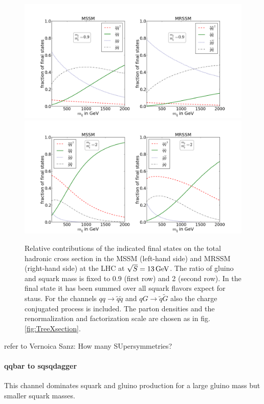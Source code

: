 \begin{figure}[!htpb]
\begin{center}
\includegraphics[scale=.45]{figures/rel_weights_mr=0,9_MSSM+MRSSM}
\includegraphics[scale=.45]{figures/rel_weights_mr=2_MSSM+MRSSM}
\caption{Relative contributions of the indicated final states on the total hadronic cross section in the MSSM (left-hand side) and MRSSM (right-hand side) at the LHC at $\sqrt{S} = \unit[13]{GeV}$. The ratio of gluino and squark mass is fixed to 0.9 (first row) and 2 (second row). In the final state it has been summed over all squark flavors expect for staus. For the channels $qq \to \tilde{q}\tilde{q}$ and $qG \to \tilde{q}\tilde{G}$ also the charge conjugated process is included. The parton densities and the renormalization and factorization scale are chosen as in fig. \ref{fig:TreeXsection}.}\label{fig:TreeLevelSigma_0,9_2}
\end{center}
\end{figure}



refer to Vernoica Sanz: How many SUpersymmetries?
\paragraph{qqbar to sqsqdagger}
This channel dominates squark and gluino production for a large gluino mass but smaller squark masses.
